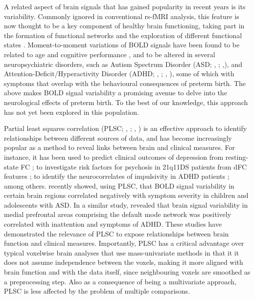    A related aspect of brain signals that has gained popularity in recent years is its variability. Commonly ignored in conventional rs-fMRI analysis, this feature is now thought to be a key component of healthy brain functioning, taking part in the formation of functional networks \citep{Fuchs2007} and the exploration of different functional states \citep{Ghosh2008, McIntosh2010}. Moment-to-moment variations of BOLD signals have been found to be related to age and cognitive performance \citep{Garrett2013}, and to be altered in several neuropsychiatric disorders, such as Autism Spectrum Disorder (ASD; \citeauthor{DiMartino2014}, \citeyear{DiMartino2014}; \citeauthor{Easson2019},\citeyear{Easson2019}), and  Attention-Deficit/Hyperactivity Disorder (ADHD; \citeauthor{Zang2007}, \citeyear{Zang2007}; \citeauthor{Nomi2018}, \citeyear{Nomi2018}), some of which with symptoms that overlap with the behavioural consequences of preterm birth. The above makes BOLD signal variability a promising avenue to delve into the neurological effects of preterm birth. To the best of our knowledge, this approach has not yet been explored in this population.

      Partial least squares correlation (PLSC; \citeauthor{McIntosh2004}, \citeyear{McIntosh2004}; \citeauthor{Krishnan2011}, \citeyear{Krishnan2011})  is an effective approach to identify relationships between different sources of data, and has become increasingly popular as a method to reveal links between brain and clinical measures. For instance, it has been used to predict clinical outcomes of depression from resting-state FC \citep{Yoshida2017}; to investigate risk factors for psychosis in 21q11DS patients from dFC features \citep{Zoller2019}; to identify the neurocorrelates of impulsivity in ADHD patients \citep{Barker2019}; among others. \cite{Easson2019} recently showed, using PLSC, that BOLD signal variability in certain brain regions correlated negatively with symptom severity in children and adolescents with ASD. In a similar study, \citep{Nomi2018} revealed that brain signal variability in medial prefrontal areas comprising the default mode network was positively correlated with inattention and symptoms of ADHD. These studies have demonstrated the relevance of PLSC to expose relationships between brain function and clinical measures. Importantly, PLSC has a critical advantage over typical voxelwise brain analyses that use mass-univariate methods in that it it does not assume independence between the voxels, making it more aligned with brain function and with the data itself, since neighbouring voxels are smoothed as a preprocessing step. Also as a consequence of being a multivariate approach, PLSC is less affected by the problem of multiple comparisons. 
      
